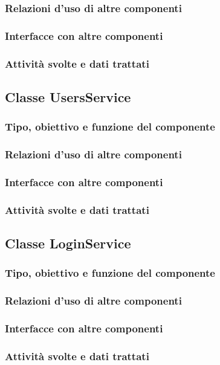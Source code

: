 \subsubsection*{Relazioni d'uso di altre componenti}
\subsubsection*{Interfacce con altre componenti}
\subsubsection*{Attivit\`a svolte e dati trattati}

\subsection{Classe UsersService}
\subsubsection*{Tipo, obiettivo e funzione del componente}
\subsubsection*{Relazioni d'uso di altre componenti}
\subsubsection*{Interfacce con altre componenti}
\subsubsection*{Attivit\`a svolte e dati trattati}

\subsection{Classe LoginService}
\subsubsection*{Tipo, obiettivo e funzione del componente}
\subsubsection*{Relazioni d'uso di altre componenti}
\subsubsection*{Interfacce con altre componenti}
\subsubsection*{Attivit\`a svolte e dati trattati}


